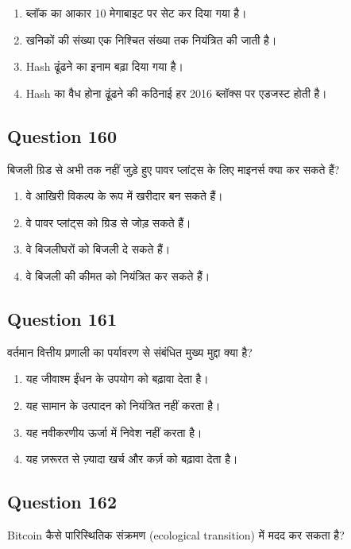 \documentclass[12pt,a4paper]{article}
\begin{document}
\begin{enumerate}[label=\Alph*., leftmargin=*]
\item ब्लॉक का आकार 10 मेगाबाइट पर सेट कर दिया गया है।
\item खनिकों की संख्या एक निश्चित संख्या तक नियंत्रित की जाती है।
\item Hash ढूंढने का इनाम बढ़ा दिया गया है।
\item Hash का वैध होना ढूंढने की कठिनाई हर 2016 ब्लॉक्स पर एडजस्ट होती है।
\end{enumerate}

\bigskip


\subsection*{Question 160}
बिजली ग्रिड से अभी तक नहीं जुड़े हुए पावर प्लांट्स के लिए माइनर्स क्या कर सकते हैं?

\begin{enumerate}[label=\Alph*., leftmargin=*]
\item वे आखिरी विकल्प के रूप में खरीदार बन सकते हैं।
\item वे पावर प्लांट्स को ग्रिड से जोड़ सकते हैं।
\item वे बिजलीघरों को बिजली दे सकते हैं।
\item वे बिजली की कीमत को नियंत्रित कर सकते हैं।
\end{enumerate}

\bigskip


\subsection*{Question 161}
वर्तमान वित्तीय प्रणाली का पर्यावरण से संबंधित मुख्य मुद्दा क्या है?

\begin{enumerate}[label=\Alph*., leftmargin=*]
\item यह जीवाश्म ईंधन के उपयोग को बढ़ावा देता है।
\item यह सामान के उत्पादन को नियंत्रित नहीं करता है।
\item यह नवीकरणीय ऊर्जा में निवेश नहीं करता है।
\item यह ज़रूरत से ज़्यादा खर्च और कर्ज़ को बढ़ावा देता है।
\end{enumerate}

\bigskip


\subsection*{Question 162}
Bitcoin कैसे पारिस्थितिक संक्रमण (ecological transition) में मदद कर सकता है?
\end{document}
